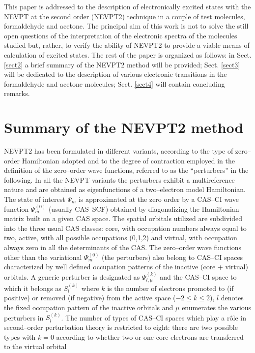 \documentclass[global,referee]{svjour}
\newcommand{\psim}{\Psi_m}
\newcommand{\psimz}{\Psi_m^{(0)}}
\newcommand{\pertu}{\Psi_{l,\mu}^{(k)}}
\newcommand{\pertus}{S_l^{(k)}}
\begin{document}
This paper is addressed to the description of electronically excited
states with the NEVPT at the second order (NEVPT2)
technique in a couple of test molecules, formaldehyde and acetone.
The principal aim of this work is not to solve the still open questions of the interpretation of the
electronic spectra of the molecules studied but, rather, to verify 
the ability of NEVPT2 to provide a viable means of calculation of excited states.
The rest of
the paper is organized as follows: in Sect. \ref{sect2} a brief summary of
the NEVPT2 method will be provided; Sect. \ref{sect3}  will be
dedicated to the description of various electronic transitions in the
formaldehyde and acetone molecules; Sect. \ref{sect4} will
contain concluding remarks.


\section{Summary of the NEVPT2 method\label{sect2}}
NEVPT2 has been formulated in different variants, according to the
type of zero--order Hamiltonian adopted and to the degree of
contraction employed in the definition of the zero--order
wave functions, referred to as the ``perturbers'' in the following. In
all the NEVPT variants the perturbers exhibit a multireference nature
and are obtained as eigenfunctions of a two--electron model
Hamiltonian. The state of interest $\psim$ is approximated at the zero
order by a CAS--CI wave function $\psimz$ (usually CAS--SCF) obtained
by diagonalizing the Hamiltonian matrix built on a given CAS
space. The spatial orbitals utilized are subdivided into the three
usual CAS classes: core, with occupation numbers always equal to two,
active, with all possible occupations (0,1,2) and virtual, with
occupation always zero in all the determinants of the CAS. The
zero--order wave functions other than the variational $\psimz$ (the
perturbers) also belong to CAS--CI spaces characterized by well
defined occupation patterns of the inactive (core + virtual)
orbitals. A generic perturber is designated as $\pertu$ and the
CAS--CI space to which it belongs as $\pertus$ where $k$ is the number
of electrons promoted to (if positive) or removed (if negative) from
the active space ($-2\le k\le 2$), $l$ denotes the fixed occupation
pattern of the inactive orbitals and $\mu$ enumerates the various
perturbers in $\pertus$. The number of types of CAS--CI spaces which
play a r\^ole in second--order perturbation theory is restricted to
eight: there are two possible types with $k=0$ according to whether
two or one core electrons are transferred to the virtual orbital
\end{document}
